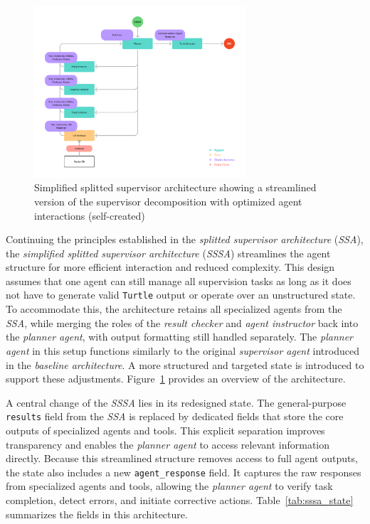 \documentclass[a4paper,oneside,bibliography=totoc]{scrbook}
\begin{document}
\begin{figure}[tp]
  \centering
  \includegraphics[width=0.7\textwidth]{figures/Simplified Splitted Supervisor Architecture.png}
  \caption[Simplified splitted supervisor architecture showing a streamlined version of the supervisor decomposition with optimized agent interactions]{Simplified splitted supervisor architecture showing a streamlined version of the supervisor decomposition with optimized agent interactions (self-created)}
  \label{fig:simplified_splitted_supervisor_architecture}
\end{figure}

Continuing the principles established in the \textit{splitted supervisor architecture} (\textit{\ac{SSA}}), the \textit{simplified splitted supervisor architecture} (\textit{\ac{SSSA}}) streamlines the agent structure for more efficient interaction and reduced complexity. This design assumes that one agent can still manage all supervision tasks as long as it does not have to generate valid \texttt{Turtle} output or operate over an unstructured state. To accommodate this, the architecture retains all specialized agents from the \textit{\ac{SSA}}, while merging the roles of the \textit{result checker} and \textit{agent instructor} back into the \textit{planner agent}, with output formatting still handled separately. The \textit{planner agent} in this setup functions similarly to the original \textit{supervisor agent} introduced in the \textit{baseline architecture}. A more structured and targeted state is introduced to support these adjustments. Figure~\ref{fig:simplified_splitted_supervisor_architecture} provides an overview of the architecture.

A central change of the \textit{\ac{SSSA}} lies in its redesigned state. The general-purpose \texttt{results} field from the \textit{\ac{SSA}} is replaced by dedicated fields that store the core outputs of specialized agents and tools. This explicit separation improves transparency and enables the \textit{planner agent} to access relevant information directly. Because this streamlined structure removes access to full agent outputs, the state also includes a new \texttt{agent\_response} field. It captures the raw responses from specialized agents and tools, allowing the \textit{planner agent} to verify task completion, detect errors, and initiate corrective actions. Table~\ref{tab:sssa_state} summarizes the fields in this architecture.
\end{document}

